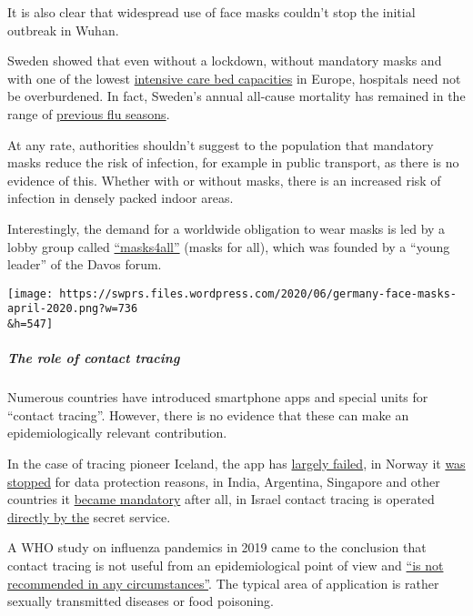 It is also clear that widespread use of face masks couldn't stop the
initial outbreak in Wuhan.

Sweden showed that even without a lockdown, without mandatory masks and
with one of the lowest
\href{https://link.springer.com/article/10.1007/s00134-012-2627-8}{intensive
care bed capacities} in Europe, hospitals need not be overburdened. In
fact, Sweden's annual all-cause mortality has remained in the range of
\href{https://swprs.files.wordpress.com/2020/06/sweden-all-cause-nov-may-1990.jpg}{previous
flu seasons}.

At any rate, authorities shouldn't suggest to the population that
mandatory masks reduce the risk of infection, for example in public
transport, as there is no evidence of this. Whether with or without
masks, there is an increased risk of infection in densely packed indoor
areas.

Interestingly, the demand for a worldwide obligation to wear masks is
led by a lobby group called
\href{https://masks4all.co/about-us/}{``masks4all''} (masks for all),
which was founded by a ``young leader'' of the Davos forum.

\texttt{[image: https://swprs.files.wordpress.com/2020/06/germany-face-masks-april-2020.png?w=736\\\&h=547]}

\hypertarget{the-role-of-contact-tracing}{%
\subparagraph{\texorpdfstring{\textbf{The role of contact
tracing}}{The role of contact tracing}}\label{the-role-of-contact-tracing}}

Numerous countries have introduced smartphone apps and special units for
``contact tracing''. However, there is no evidence that these can make
an epidemiologically relevant contribution.

In the case of tracing pioneer Iceland, the app has
\href{https://www.technologyreview.com/2020/05/11/1001541/iceland-rakning-c19-covid-contact-tracing/}{largely
failed}, in Norway it
\href{https://www.msn.com/en-us/news/technology/norway-to-halt-covid-19-track-and-trace-app-on-data-protection-concerns/ar-BB15uMEM}{was
stopped} for data protection reasons, in India, Argentina, Singapore and
other countries it
\href{https://www.technologyreview.com/2020/05/07/1001360/india-aarogya-setu-covid-app-mandatory/}{became
mandatory} after all, in Israel contact tracing is operated
\href{https://www.jewishpress.com/news/the-courts/state-to-high-court-even-more-shin-bet-involvement-in-fighting-the-coronavirus/2020/04/14/}{directly
by the} secret service.

A WHO study on influenza pandemics in 2019 came to the conclusion that
contact tracing is not useful from an epidemiological point of view and
\href{https://apps.who.int/iris/bitstream/handle/10665/329438/9789241516839-eng.pdf\#page=9}{``is
not recommended in any circumstances''}. The typical area of application
is rather sexually transmitted diseases or food poisoning.

